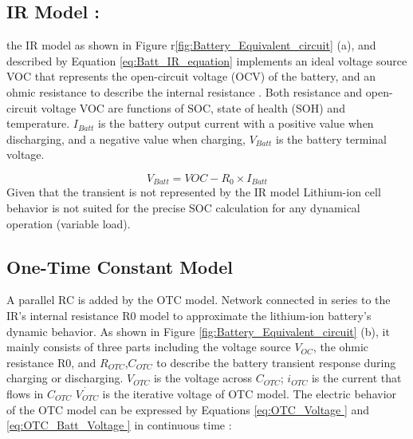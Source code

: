 \subsection{IR Model :}
the IR model as shown in Figure r\ref{fig:Battery_Equivalent_circuit} (a), and 
described by Equation \ref{eq:Batt_IR_equation} implements an ideal voltage 
source VOC that represents the open-circuit voltage (OCV) 
of the battery, and an ohmic resistance to describe 
the internal resistance \cite{UKEMPT_AHMAD2012}. Both resistance and open-circuit 
voltage VOC are functions of SOC, state of health (SOH) 
and temperature. $I_{Batt}$ is the battery output current with a 
positive value when discharging, and a negative value when 
charging, $V_{Batt}$ is the battery terminal voltage\cite{UKEMPT_AHMAD2012}.

\begin{equation}\label{eq:Batt_IR_equation}
    V_{Batt} = V{OC} - R_{0}\times I_{Batt}
\end{equation}
Given that the transient is not represented by the IR model
Lithium-ion cell behavior is not suited for the
precise SOC calculation for any dynamical operation
(variable load).

\subsection{One-Time Constant Model }
A parallel RC is added by the OTC model.
Network connected in series to the IR's internal resistance R0
model to approximate the lithium-ion battery's dynamic behavior.
As shown in Figure \ref{fig:Battery_Equivalent_circuit} (b), it mainly 
consists of three parts including the voltage source $V_{OC}$, the 
ohmic resistance R0, and $R_{OTC}$,$C_{OTC}$ to describe the battery 
transient response during charging or discharging. $\textit{V}_{OTC}$ is 
the voltage across $C_{OTC}$; $i_{OTC}$ is the current that flows in 
$C_{OTC}$ \cite{UKEMPT_AHMAD2012} $\dot{\textit{V}_{OTC}}$ is the iterative voltage of OTC model. The electric behavior of the OTC model can be 
expressed by Equations \ref{eq:OTC_Voltage } and \ref{eq:OTC_Batt_Voltage } \cite{UKEMPT_AHMAD2012} in continuous time \cite{UniPadua_Giacomo}: 

